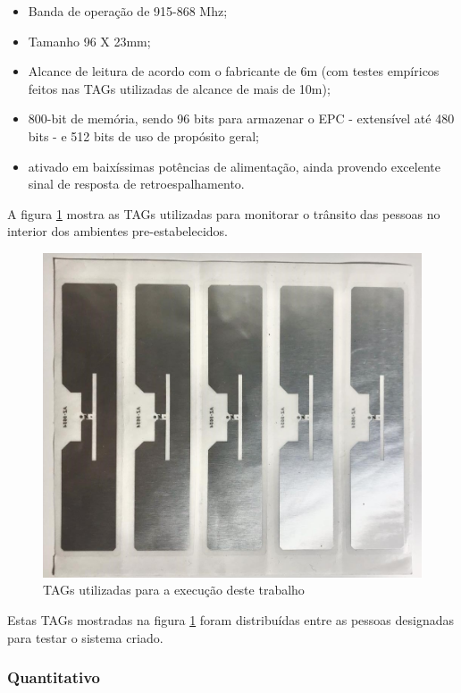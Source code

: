 \begin{itemize}
    \item Banda de operação de 915-868 Mhz;
    \item Tamanho 96 X 23mm;
    \item Alcance de leitura de acordo com o fabricante de 6m (com testes empíricos feitos nas TAGs utilizadas de alcance de mais de 10m);
    \item 800-bit de memória, sendo 96 bits para armazenar o EPC - extensível até 480 bits - e 512 bits de uso de propósito geral; \cite{AlienHiggs3}
    \item ativado em baixíssimas potências de alimentação, ainda provendo excelente sinal de resposta de retroespalhamento. \cite{AlienHiggs3}
\end{itemize}

A figura \ref{fig:TAGsused} mostra as TAGs utilizadas para monitorar o trânsito das pessoas no interior dos ambientes pre-estabelecidos.

 \begin{figure}[H]
    \centering
    \includegraphics[width=0.8\linewidth]{figs/Metodologia/TAGsRFID.jpeg}
    \caption{TAGs utilizadas para a execução deste trabalho}
    \label{fig:TAGsused}
\end{figure}
 
 Estas TAGs mostradas na figura \ref{fig:TAGsused} foram distribuídas entre as pessoas designadas para testar o sistema criado. %
 
 \subsubsection{Quantitativo}
 
